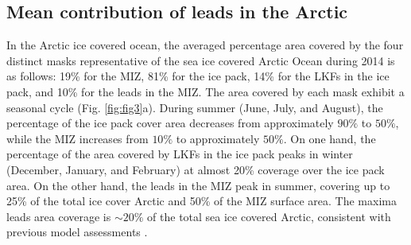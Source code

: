 \documentclass[draft]{agujournal2019}
\begin{document}
\subsection*{Mean contribution of leads in the Arctic}

In the Arctic ice covered ocean, the averaged percentage area covered by the four distinct masks representative of the sea ice covered Arctic Ocean during 2014 is as follows: 19\% for the MIZ, 81\% for the ice pack, 14\% for the LKFs in the ice pack, and 10\% for the leads in the MIZ. 
The area covered by each mask exhibit a seasonal cycle (Fig. \ref{fig:fig3}a). During summer (June, July, and August), the percentage of the ice pack cover area decreases from approximately $90\%$ to $50\%$, while the MIZ increases from $10\%$ to approximately $50\%$. 
On one hand, the percentage of the area covered by LKFs in the ice pack peaks in winter (December, January, and February) at almost 20\% coverage over the ice pack area. On the other hand, the leads in the MIZ peak in summer, covering up to 25\% of the total ice cover Arctic and 50\% of the MIZ surface area. The maxima leads area coverage is $\sim 20\%$ of the total sea ice covered Arctic, consistent with previous model assessments \citep{Wang_leads_2016}. 
\end{document}
